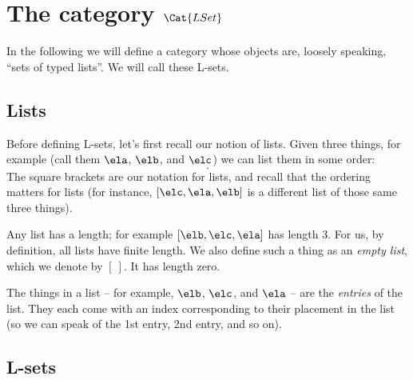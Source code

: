 {    \showslides{
        \begin{forslides}

            \begin{equation}
                \tupca \ela   = \ela
            \end{equation}
            ~
            \begin{equation}
                \label{eq:sets-monoid-el-cat}
                \tupcat \ela \elb \elconcat \elc = \tupcatt \ela \elb \elc
            \end{equation}
        \end{forslides}
    }

}


\section{The category $\Cat{LSet}$}

In the following we will define a category whose objects are, loosely speaking, ``sets of typed lists''. We will call these L-sets. 

\subsection{Lists}

Before defining L-sets, let's first recall our notion of lists. Given three things, for example (call them $\ela$, $\elb$, and $\elc$) we can list them in some order: 
\begin{equation}
[\elb, \elc, \ela].
\end{equation}
The square brackets are our notation for lists, and recall that the ordering matters for lists (for instance, $[\elc, \ela, \elb]$ is a different list of those same three things). 

Any list has a length; for example $[\elb, \elc, \ela]$ has length 3. For us, by definition, all lists have finite length. We also define such a thing as an \emph{empty list}, which we denote by $[ \ ]$. It has length zero. 

The things in a list -- for example, $\elb$, $\elc$, and $\ela$ -- are the \emph{entries} of the list. They each come with an index corresponding to their placement in the list (so we can speak of the 1st entry, 2nd entry, and so on).  


\subsection{L-sets}

